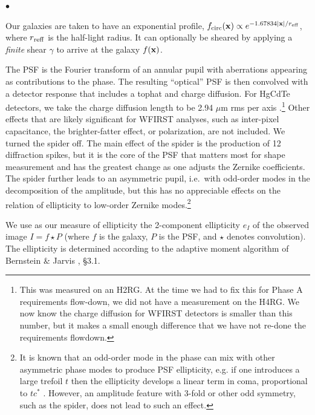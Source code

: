 \documentclass[aps,prd, amsmath,amssymb,superscriptaddress,showkeys,nofootinbib,reprint,preprintnumbers]{revtex4-1}
\begin{document}
\begin{list}{$\bullet$}{}
\item Our galaxies are taken to have an exponential profile, $f_{\rm circ}({\bf x}) \propto e^{-1.67834|{\bf x}|/r_{\rm eff}}$, where $r_{\rm reff}$ is the half-light radius. It can optionally be sheared by applying a {\em finite} shear $\gamma$ to arrive at the galaxy $f({\bf x})$.
\item The PSF is the Fourier transform of an
annular pupil with aberrations appearing as contributions to the
phase. The resulting ``optical'' PSF is then convolved with a detector
response that includes a tophat and charge diffusion. For HgCdTe
detectors, we take the charge diffusion length to be 2.94 $\mu$m rms
per axis \cite{2007PASP..119..466B}.\footnote{This was measured on an H2RG. At the time we had to fix this for Phase A requirements
flow-down, we did not have a measurement on the H4RG. We now know the charge diffusion for WFIRST detectors is smaller than this number, but it makes a small enough difference that we have not re-done the requirements flowdown.} Other effects that are likely significant for WFIRST analyses, such as inter-pixel capacitance, the brighter-fatter effect, or polarization, are not included. We turned the spider off. The main effect of the spider is the production of 12 diffraction spikes, but it is the core of the PSF that matters most for shape measurement and has the greatest change as one adjusts the Zernike coefficients. The spider further leads to an asymmetric pupil, i.e.\ with odd-order modes in the decomposition of the amplitude, but this has no appreciable effects on the relation of ellipticity to low-order Zernike modes.\footnote{It is known that an odd-order mode in the phase can
mix with other asymmetric phase modes to produce PSF ellipticity,
e.g. if one introduces a large trefoil $t$ then the ellipticity
develops a linear term in coma, proportional to $tc^\ast$
\cite{2010SPIE.7731E..1EN}. However, an amplitude feature with 3-fold
or other odd symmetry, such as the spider, does not lead to such an
effect.}
\item We use as our measure of ellipticity the 2-component ellipticity $e_I$ of the observed image $I = f \star P$ (where $f$ is the galaxy, $P$ is the PSF, and $\star$ denotes convolution). The ellipticity is determined according to the adaptive moment algorithm of Bernstein \& Jarvis \cite{2002AJ....123..583B}, \S3.1.
\end{list}
\end{document}
